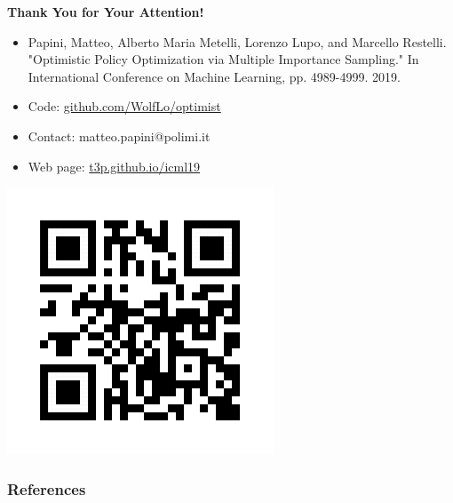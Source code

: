 \documentclass[aspectratio=169, table]{beamer}
\newcommand{\enb}[1]{\textcolor{poliblue1}{\textbf{#1}}}
\begin{document}
\begin{frame}[plain]
\begin{center}
	\huge{\enb{Thank You for Your Attention!}}
\end{center}

\begin{minipage}[]{.5\paperwidth}
	\begin{itemize}
		\item[] Papini, Matteo, Alberto Maria Metelli, Lorenzo Lupo, and Marcello Restelli. "Optimistic Policy Optimization via Multiple Importance Sampling." In International Conference on Machine Learning, pp. 4989-4999. 2019.
		\item[] Code: \url{github.com/WolfLo/optimist}
		\item[] Contact: matteo.papini@polimi.it
		\item[] Web page: \url{t3p.github.io/icml19} 
	\end{itemize}
\end{minipage}
\hspace{2cm}%
\begin{minipage}[]{.2\paperwidth}
	\includegraphics[width=\textwidth]{qr.png}
\end{minipage}
\end{frame}


\begin{frame}
\frametitle{References}


\end{frame}

\end{document}
